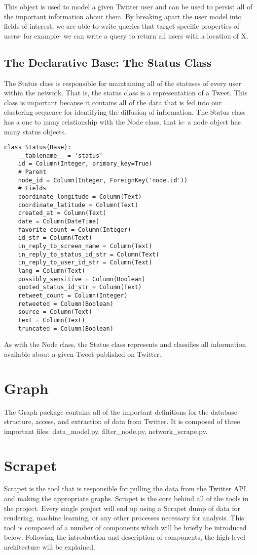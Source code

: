 This object is used to model a given Twitter user and can be used to
persist all of the important information about them. By breaking apart
the user model into fields of interest, we are able to write queries
that target specific properties of users- for example- we can write a
query to return all users with a location of X.

\subsection{The Declarative Base: The  Status Class}
The Status class is responsible for maintaining all of the statuses of
every user within the network. That is, the status class is a
representation of a Tweet. This class is important because it contains
all of the data that is fed into our clustering sequence for
identifying the diffusion of information. The Status class has a one
to many relationship with the Node class, that is- a node object has
many status objects.

\begin{lstlisting}
class Status(Base):
    __tablename__ = 'status'
    id = Column(Integer, primary_key=True)
    # Parent
    node_id = Column(Integer, ForeignKey('node.id'))
    # Fields
    coordinate_longitude = Column(Text)
    coordinate_latitude = Column(Text)
    created_at = Column(Text)
    date = Column(DateTime)
    favorite_count = Column(Integer)
    id_str = Column(Text)
    in_reply_to_screen_name = Column(Text)
    in_reply_to_status_id_str = Column(Text)
    in_reply_to_user_id_str = Column(Text)
    lang = Column(Text)
    possibly_sensitive = Column(Boolean)
    quoted_status_id_str = Column(Text)
    retweet_count = Column(Integer)
    retweeted = Column(Boolean)
    source = Column(Text)
    text = Column(Text)
    truncated = Column(Boolean)
\end{lstlisting}

As with the Node class, the Status class represents and classifies all
information available about a given Tweet published on Twitter.

\section{Graph}
The Graph package contains all of the important definitions for the
database structure, access, and extraction of data from Twitter. It is
composed of three important files: data\_model.py, filter\_node.py,
network\_scrape.py.


\section{Scrapet}
Scrapet is the tool that is responsible for pulling the data from the
Twitter API and making the appropriate graphs. Scrapet is the core
behind all of the tools in the project. Every single project will end
up using a Scrapet dump of data for rendering, machine learning, or
any other processes necessary for analysis. This tool is composed of a
number of components which will be briefly be introduced
below. Following the introduction and description of components, the
high level architecture will be explained.

